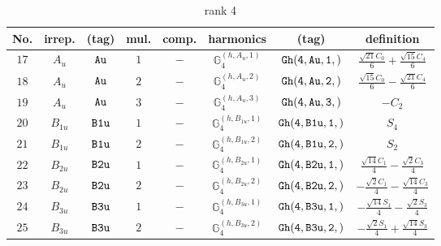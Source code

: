 \documentclass[fleqn,8pt]{jsarticle}
\begin{document}
\begin{table}[ht!]
\begin{center}
\caption{rank 4}
\renewcommand{\arraystretch}{1.3}
\begin{tabular}{cccccccc} \hline \hline
No. & irrep. & (tag) & mul. & comp. & harmonics & (tag) & definition \\ \hline
$ 17 $ & $ A_{u} $ & $ {\tt Au} $ & $ 1 $ & $ - $ & $ \mathbb{G}_{4}^{(h,A_{u},1)} $ & $ {\tt Gh(4,Au,1,)} $ & $ \frac{\sqrt{21} C_{0}}{6} + \frac{\sqrt{15} C_{4}}{6} $ \\
$ 18 $ & $ A_{u} $ & $ {\tt Au} $ & $ 2 $ & $ - $ & $ \mathbb{G}_{4}^{(h,A_{u},2)} $ & $ {\tt Gh(4,Au,2,)} $ & $ \frac{\sqrt{15} C_{0}}{6} - \frac{\sqrt{21} C_{4}}{6} $ \\
$ 19 $ & $ A_{u} $ & $ {\tt Au} $ & $ 3 $ & $ - $ & $ \mathbb{G}_{4}^{(h,A_{u},3)} $ & $ {\tt Gh(4,Au,3,)} $ & $ - C_{2} $ \\
$ 20 $ & $ B_{1u} $ & $ {\tt B1u} $ & $ 1 $ & $ - $ & $ \mathbb{G}_{4}^{(h,B_{1u},1)} $ & $ {\tt Gh(4,B1u,1,)} $ & $ S_{4} $ \\
$ 21 $ & $ B_{1u} $ & $ {\tt B1u} $ & $ 2 $ & $ - $ & $ \mathbb{G}_{4}^{(h,B_{1u},2)} $ & $ {\tt Gh(4,B1u,2,)} $ & $ S_{2} $ \\
$ 22 $ & $ B_{2u} $ & $ {\tt B2u} $ & $ 1 $ & $ - $ & $ \mathbb{G}_{4}^{(h,B_{2u},1)} $ & $ {\tt Gh(4,B2u,1,)} $ & $ \frac{\sqrt{14} C_{1}}{4} - \frac{\sqrt{2} C_{3}}{4} $ \\
$ 23 $ & $ B_{2u} $ & $ {\tt B2u} $ & $ 2 $ & $ - $ & $ \mathbb{G}_{4}^{(h,B_{2u},2)} $ & $ {\tt Gh(4,B2u,2,)} $ & $ - \frac{\sqrt{2} C_{1}}{4} - \frac{\sqrt{14} C_{3}}{4} $ \\
$ 24 $ & $ B_{3u} $ & $ {\tt B3u} $ & $ 1 $ & $ - $ & $ \mathbb{G}_{4}^{(h,B_{3u},1)} $ & $ {\tt Gh(4,B3u,1,)} $ & $ - \frac{\sqrt{14} S_{1}}{4} - \frac{\sqrt{2} S_{3}}{4} $ \\
$ 25 $ & $ B_{3u} $ & $ {\tt B3u} $ & $ 2 $ & $ - $ & $ \mathbb{G}_{4}^{(h,B_{3u},2)} $ & $ {\tt Gh(4,B3u,2,)} $ & $ - \frac{\sqrt{2} S_{1}}{4} + \frac{\sqrt{14} S_{3}}{4} $ \\
 \hline \hline
\end{tabular}
\end{center}
\end{table}
\end{document}

